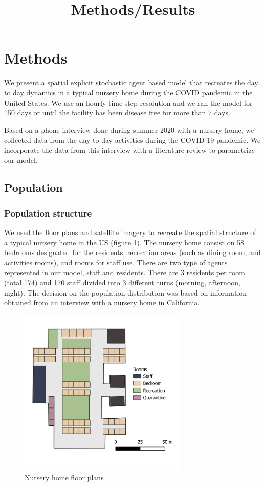 \documentclass[
]{article}
\title{Methods/Results}
\author{}
\date{\vspace{-2.5em}}
\begin{document}
\maketitle

\hypertarget{methods}{%
\section{Methods}\label{methods}}

We present a spatial explicit stochastic agent based model that
recreates the day to day dynamics in a typical nursery home during the
COVID pandemic in the United States. We use an hourly time step
resolution and we ran the model for 150 days or until the facility has
been disease free for more than 7 days.

Based on a phone interview done during summer 2020 with a nursery home,
we collected data from the day to day activities during the COVID 19
pandemic. We incorporate the data from this interview with a literature
review to parametrize our model.

\hypertarget{population}{%
\subsection{Population}\label{population}}

\hypertarget{population-structure}{%
\subsubsection{Population structure}\label{population-structure}}

We used the floor plans and satellite imagery to recreate the spatial
structure of a typical nursery home in the US (figure 1). The nursery
home consist on 58 bedrooms designated for the residents, recreation
areas (such as dining room, and activities rooms), and rooms for staff
use. There are two type of agents represented in our model, staff and
residents. There are 3 residents per room (total 174) and 170 staff
divided into 3 different turns (morning, afternoon, night). The decision
on the population distribution was based on information obtained from an
interview with a nursery home in California.

\begin{figure}[h]
\caption{Nursery home floor plans}
\centering
\includegraphics[width=8cm]{Figures/NH_B}
\end{figure}
\end{document}
